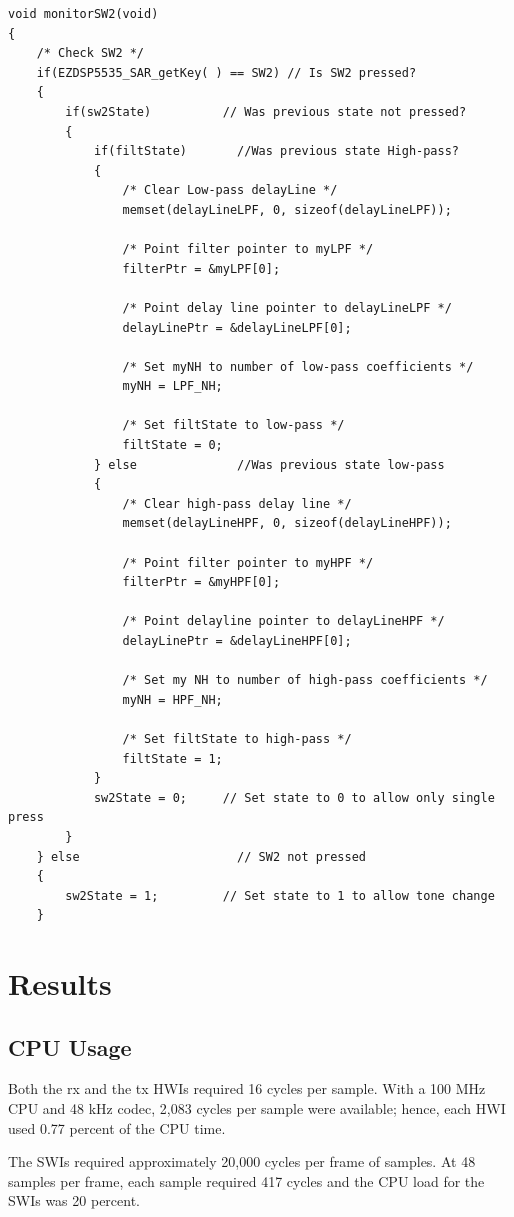 \documentclass[11pt,pdftex,portrait,letterpaper]{article}
\begin{document}
\begin{lstlisting}[caption={IDL thread for monitoring switch two strokes and changing filters}, label=l:programe]
void monitorSW2(void)
{
	/* Check SW2 */
	if(EZDSP5535_SAR_getKey( ) == SW2) // Is SW2 pressed?
	{
		if(sw2State)          // Was previous state not pressed?
		{
			if(filtState)		//Was previous state High-pass?
			{
				/* Clear Low-pass delayLine */
				memset(delayLineLPF, 0, sizeof(delayLineLPF));

				/* Point filter pointer to myLPF */
				filterPtr = &myLPF[0];

				/* Point delay line pointer to delayLineLPF */
				delayLinePtr = &delayLineLPF[0];

				/* Set myNH to number of low-pass coefficients */
				myNH = LPF_NH;

				/* Set filtState to low-pass */
				filtState = 0;
			} else				//Was previous state low-pass
			{
				/* Clear high-pass delay line */
				memset(delayLineHPF, 0, sizeof(delayLineHPF));

				/* Point filter pointer to myHPF */
				filterPtr = &myHPF[0];

				/* Point delayline pointer to delayLineHPF */
				delayLinePtr = &delayLineHPF[0];

				/* Set my NH to number of high-pass coefficients */
				myNH = HPF_NH;

				/* Set filtState to high-pass */
				filtState = 1;
			}
			sw2State = 0;     // Set state to 0 to allow only single press
		}
	} else                      // SW2 not pressed
	{
		sw2State = 1;         // Set state to 1 to allow tone change
	}
\end{lstlisting}

\section{Results}

\subsection{CPU Usage}

Both the rx and the tx HWIs required 16 cycles per sample. With a 100 MHz CPU and 48 kHz codec, 2,083 cycles per sample were available; hence, each HWI used 0.77 percent of the CPU time.

The SWIs required approximately 20,000 cycles per frame of samples. At 48 samples per frame, each sample required 417 cycles and the CPU load for the SWIs was 20 percent.
\end{document}

